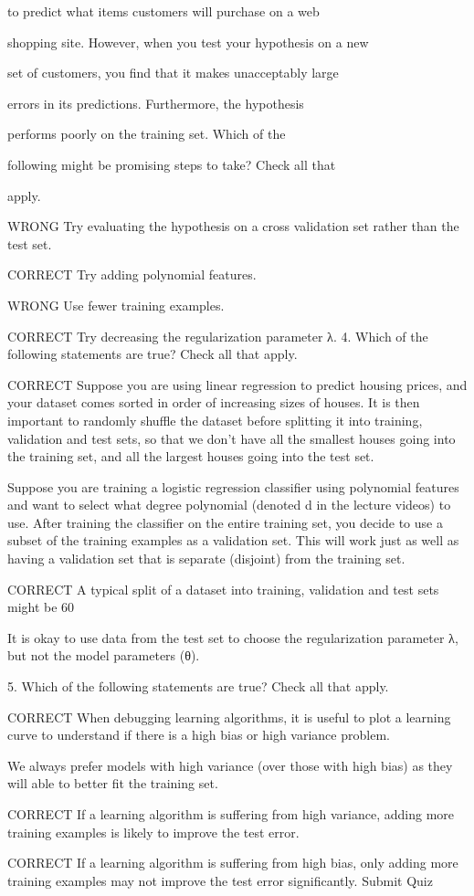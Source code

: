 to predict what items customers will purchase on a web

shopping site. However, when you test your hypothesis on a new

set of customers, you find that it makes unacceptably large

errors in its predictions. Furthermore, the hypothesis

performs poorly on the training set. Which of the

following might be promising steps to take? Check all that

apply.


WRONG Try evaluating the hypothesis on a cross validation set rather than the test set.


CORRECT  Try adding polynomial features.

WRONG Use fewer training examples.

CORRECT Try decreasing the regularization parameter λ.
4. 
Which of the following statements are true? Check all that apply.

CORRECT Suppose you are using linear regression to predict housing prices, and your dataset comes sorted in order of increasing sizes of houses. It is then important to randomly shuffle the dataset before splitting it into training, validation and test sets, so that we don’t have all the smallest houses going into the training set, and all the largest houses going into the test set.

Suppose you are training a logistic regression classifier using polynomial features and want to select what degree polynomial (denoted d in the lecture videos) to use. After training the classifier on the entire training set, you decide to use a subset of the training examples as a validation set. This will work just as well as having a validation set that is separate (disjoint) from the training set.

CORRECT A typical split of a dataset into training, validation and test sets might be 60%

It is okay to use data from the test set to choose the regularization parameter λ, but not the model parameters (θ).

5. 
Which of the following statements are true? Check all that apply.

CORRECT When debugging learning algorithms, it is useful to plot a learning curve to understand if there is a high bias or high variance problem.

We always prefer models with high variance (over those with high bias) as they will able to better fit the training set.

CORRECT If a learning algorithm is suffering from high variance, adding more training examples is likely to improve the test error.

CORRECT If a learning algorithm is suffering from high bias, only adding more training examples may not improve the test error significantly.
Submit Quiz


